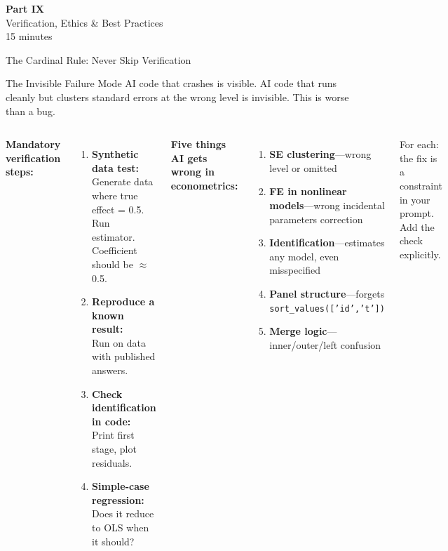 \documentclass[aspectratio=169,10pt]{beamer}
\newcommand{\emphc}[1]{\textcolor{harvardcrimson}{#1}}
\begin{document}
\begin{frame}{}
\vfill
\begin{center}
{\Huge \textcolor{uzhblue}{\textbf{Part IX}}}\\[12pt]
{\LARGE Verification, Ethics \& Best Practices}\\[6pt]
{\small 15 minutes}
\end{center}
\vfill
\end{frame}

\begin{frame}[fragile]{The Cardinal Rule: Never Skip Verification}
\small
\begin{alertblock}{The Invisible Failure Mode}
AI code that \emphc{crashes} is visible. AI code that runs cleanly but clusters standard errors at the wrong level is \emphc{invisible}. This is worse than a bug.
\end{alertblock}

\vspace{0.2em}
\begin{columns}[T]
\textbf{Mandatory verification steps:}
\begin{enumerate}\itemsep2pt
    \item \textbf{Synthetic data test:}\\
    {\scriptsize Generate data where true effect = 0.5. Run estimator. Coefficient should be $\approx$0.5.}
    \item \textbf{Reproduce a known result:}\\
    {\scriptsize Run on data with published answers.}
    \item \textbf{Check identification in code:}\\
    {\scriptsize Print first stage, plot residuals.}
    \item \textbf{Simple-case regression:}\\
    {\scriptsize Does it reduce to OLS when it should?}
\end{enumerate}

\textbf{Five things AI gets wrong in econometrics:}
\begin{enumerate}\itemsep1pt
    \item \textbf{SE clustering}---wrong level or omitted
    \item \textbf{FE in nonlinear models}---wrong incidental parameters correction
    \item \textbf{Identification}---estimates any model, even misspecified
    \item \textbf{Panel structure}---forgets \texttt{sort\_values(['id','t'])}
    \item \textbf{Merge logic}---inner/outer/left confusion
\end{enumerate}

\vspace{0.2em}
{\scriptsize For each: the fix is a \emphc{constraint in your prompt}. Add the check explicitly.}
\end{columns}
\end{frame}
\end{document}
